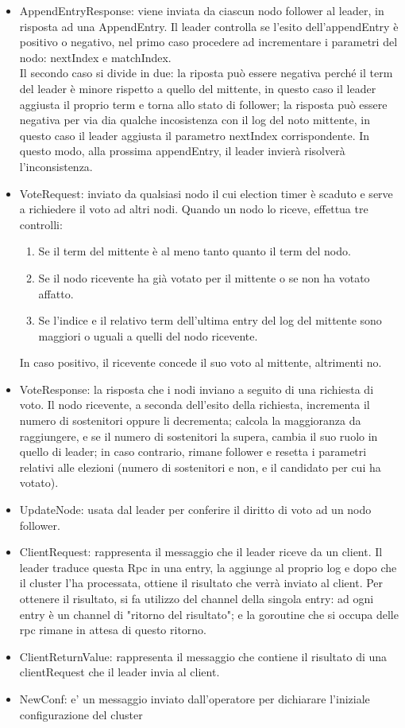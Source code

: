 \begin{itemize}
  \item AppendEntryResponse: viene inviata da ciascun nodo follower al leader, in risposta ad una AppendEntry. 
    Il leader controlla se l'esito dell'appendEntry è positivo o negativo, nel primo caso procedere ad incrementare i parametri del nodo:
    nextIndex e matchIndex. \\
    Il secondo caso si divide in due: la riposta può essere negativa perché il term del leader è minore rispetto a quello
    del mittente, in questo caso il leader aggiusta il proprio term e torna allo stato di follower; la risposta può
    essere negativa per via dia qualche incosistenza con il log del noto mittente, in questo caso il leader 
    aggiusta il parametro nextIndex corrispondente. In questo modo, alla prossima appendEntry, il leader invierà 
    risolverà l'inconsistenza.

  \item VoteRequest: inviato da qualsiasi nodo il cui election timer è scaduto e serve a richiedere il voto ad altri nodi. Quando 
    un nodo lo riceve, effettua tre controlli:
    \begin{enumerate}
      \item Se il term del mittente è al meno tanto quanto il term del nodo. 
      \item Se il nodo ricevente ha già votato per il mittente o se non ha votato affatto. 
      \item Se l'indice e il relativo term dell'ultima entry del log del mittente sono maggiori o uguali a quelli 
        del nodo ricevente.
    \end{enumerate}
    In caso positivo, il ricevente concede il suo voto al mittente, altrimenti no. 

  \item VoteResponse: la risposta che i nodi inviano a seguito di una richiesta di voto. Il nodo ricevente,
    a seconda dell'esito della richiesta, incrementa il numero di sostenitori oppure li decrementa; calcola
    la maggioranza da raggiungere, e se il numero di sostenitori la supera, cambia il suo ruolo in quello 
    di leader; in caso contrario, rimane follower e resetta i parametri relativi alle elezioni (numero di 
    sostenitori e non, e il candidato per cui ha votato).  

  \item UpdateNode: usata dal leader per conferire il diritto di voto ad un nodo follower. 

  \item ClientRequest: rappresenta il messaggio che il leader riceve da un client. Il leader traduce questa Rpc in 
    una entry, la aggiunge al proprio log e dopo che il cluster l'ha processata, ottiene il risultato che 
    verrà inviato al client. Per ottenere il risultato, si fa utilizzo del channel della singola entry: ad ogni entry è 
    un channel di "ritorno del risultato"; e la goroutine che si occupa delle rpc rimane in attesa di questo ritorno.

  \item ClientReturnValue: rappresenta il messaggio che contiene il risultato di una clientRequest che il leader 
    invia al client. 

  \item NewConf: e' un messaggio inviato dall'operatore per dichiarare l'iniziale configurazione 
      del cluster
\end{itemize}
